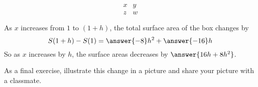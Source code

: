 \documentclass{ximera}
\begin{document}
\begin{exercise}
\[
\begin{array}{|c|c|}
x & y \\ \hline
z & w \hline
\end{array}
\]
\end{exercise}







\begin{exercise}
  As $x$ increases from $1$ to $(1+h)$, the total surface area of the
  box changes by
  \[
  S(1+h) - S(1) = \answer{-8}h^2 + \answer{-16}h
  \]
  So as $x$ increases by $h$, the surface areas decreases by
  $\answer{16h+8h^2}$.

  As a final exercise, illustrate this change in a picture and share your picture with a classmate.
  \begin{multipleChoice}
  \end{multipleChoice}
\end{exercise}
\end{document}
